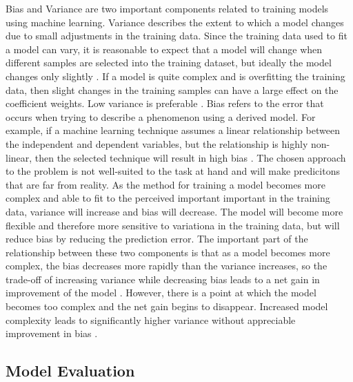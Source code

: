 \documentclass[sigconf]{acmart}
\begin{document}
Bias and Variance are two important components related to training models using machine learning. Variance describes the extent to which a model changes due to small adjustments in the training data. Since the training data used to fit a model can vary, it is reasonable to expect that a model will change when different samples are selected into the training dataset, but ideally the model changes only slightly \cite{cite03}. If a model is quite complex and is overfitting the training data, then slight changes in the training samples can have a large effect on the coefficient weights. Low variance is preferable \cite{cite03}.
Bias refers to the error that occurs when trying to describe a phenomenon using a derived model. For example, if a machine learning technique assumes a linear relationship between the independent and dependent variables, but the relationship is highly non-linear, then the selected technique will result in high bias \cite{cite03}. The chosen approach to the problem is not well-suited to the task at hand and will make predicitons that are far from reality.
As the method for training a model becomes more complex and able to fit to the perceived important important in the training data, variance will increase and bias will decrease. The model will become more flexible and therefore more sensitive to variationa in the training data, but will reduce bias by reducing the prediction error. The important part of the relationship between these two components is that as a model becomes more complex, the bias decreases more rapidly than the variance increases, so the trade-off of increasing variance while decreasing bias leads to a net gain in improvement of the model \cite{cite03}. However, there is a point at which the model becomes too complex and the net gain begins to disappear. Increased model complexity leads to significantly higher variance without appreciable improvement in bias \cite{cite03}. 

\subsection{Model Evaluation}
\end{document}
